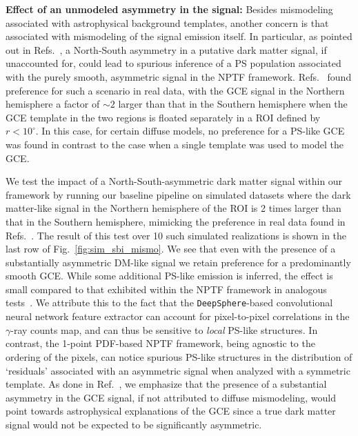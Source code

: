 \documentclass[prd,aps,10pt,nofootinbib,twocolumn,superscriptaddress,preprintnumbers,balancelastpage,longbibliography,floatfix]{revtex4-2}
\begin{document}
\noindent
\textbf{Effect of an unmodeled asymmetry in the signal:}
Besides mismodeling associated with astrophysical background templates, another concern is that associated with mismodeling of the signal emission itself. In particular, as pointed out in Refs.~\cite{Leane:2020nmi,Leane:2020pfc}, a North-South asymmetry in a putative dark matter signal, if unaccounted for, could lead to spurious inference of a PS population associated with the purely smooth, asymmetric signal in the NPTF framework. Refs.~\cite{Leane:2020nmi,Leane:2020pfc} found preference for such a scenario in real \Fermi data, with the GCE signal in the Northern hemisphere a factor of $\sim2$ larger than that in the Southern hemisphere when the GCE template in the two regions is floated separately in a ROI defined by $r < 10^\circ$. In this case, for certain diffuse models, no preference for a PS-like GCE was found in contrast to the case when a single template was used to model the GCE. 

We test the impact of a North-South-asymmetric dark matter signal within our framework by running our baseline pipeline on simulated datasets where the dark matter-like signal in the Northern hemisphere of the ROI is 2 times larger than that in the Southern hemisphere, mimicking the preference in real data found in Refs.~\cite{Leane:2020nmi,Leane:2020pfc}. The result of this test over 10 such simulated realizations is shown in the last row of Fig.~\ref{fig:sim_sbi_mismo}. We see that even with the presence of a substantially asymmetric DM-like signal we retain preference for a predominantly smooth GCE. While some additional PS-like emission is inferred, the effect is small compared to that exhibited within the NPTF framework in analogous tests~\cite{Leane:2020nmi,Leane:2020pfc}. We attribute this to the fact that the \texttt{DeepSphere}-based convolutional neural network feature extractor can account for pixel-to-pixel correlations in the $\gamma$-ray counts map, and can thus be sensitive to \emph{local} PS-like structures. In contrast, the 1-point PDF-based NPTF framework, being agnostic to the ordering of the pixels, can notice spurious PS-like structures in the distribution of `residuals' associated with an asymmetric signal when analyzed with a symmetric template.
As done in Ref.~\cite{Buschmann:2020adf}, we emphasize that the presence of a substantial asymmetry in the GCE signal, if not attributed to diffuse mismodeling, would point towards astrophysical explanations of the GCE since a true dark matter signal would not be expected to be significantly asymmetric.
\end{document}
